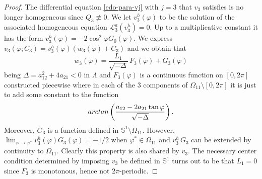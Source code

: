 \documentclass[10pt,a4paper]{amsart}
\begin{document}
\begin{proof}
The differential equation \eqref{edo-para-vj} with $j=3$ that $v_3$ satisfies is no longer homogeneous since $Q_3 \not\equiv 0$. We let $v_3^h(\varphi)$ to be the solution of the associated homogeneous equation $\mathcal{L}^{a}_3(v_3^h) = 0$. Up to a multiplicative constant it has the form $v_3^h(\varphi) = -2 \cos^2\varphi  G_0(\varphi)$. We express $v_3(\varphi; C_3) = v_3^h(\varphi) (w_3(\varphi)+ C_3)$ and we obtain that
$$
w_3(\varphi) = \frac{L_1}{\sqrt{-\Delta}} \, F_3(\varphi) + G_{3}(\varphi)
$$
being $\Delta = a_{12}^2 + 4 a_{21} < 0$ in $\Lambda$ and $F_3(\varphi)$ is a continuous function on $[0, 2 \pi]$ constructed piecewise where in each of the 3 components of $\Omega_{11} \setminus [0, 2 \pi]$ it is just to add some constant to the function
$$
{\rm arctan}\left( \frac{a_{12} -2 a_{21} \tan\varphi}{\sqrt{-\Delta}}\right).
$$
Moreover, $G_{3}$ is a function defined in $\mathbb{S}^1 \setminus \Omega_{11}$. However, $\lim_{\varphi \to \varphi^*} v_3^h(\varphi) G_{3}(\varphi)= -1/2$ when $\varphi^* \in \Omega_{11}$ and $v_3^h \, G_{3}$ can be extended by continuity to $\Omega_{11}$. Clearly this property is also shared by $v_3$. The necessary center condition determined by imposing $v_{3}$ be defined in $\mathbb{S}^1$ turns out to be that $L_1=0$ since $F_3$ is monotonous, hence not $2 \pi$-periodic.
\end{proof}
\end{document}
